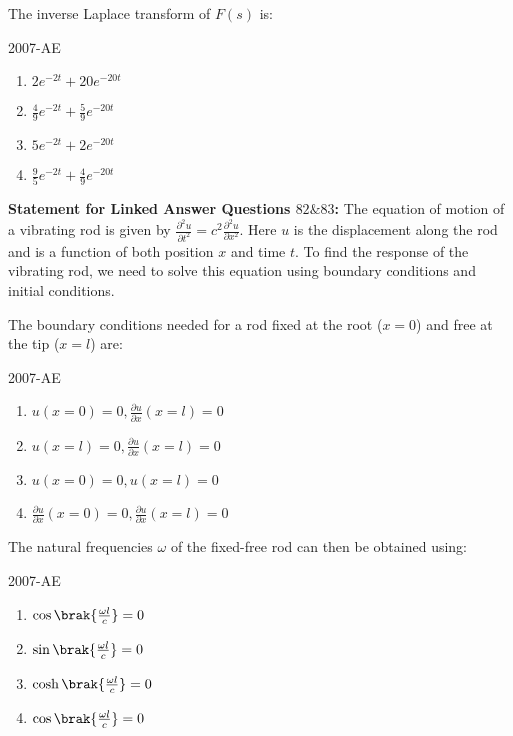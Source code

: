 \item The inverse Laplace transform of $F(s)$ is:

\hfill{2007-AE}

\begin{enumerate}
    \item  $2e^{-2t} + 20e^{-20t}$
    \item  $\frac{4}{9}e^{-2t} + \frac{5}{9}e^{-20t}$
    \item  $5e^{-2t} + 2e^{-20t}$
    \item  $\frac{9}{5}e^{-2t} + \frac{4}{9}e^{-20t}$\\
\end{enumerate}

\textbf{Statement for Linked Answer Questions $82 \& 83$:}
The equation of motion of a vibrating rod is given by $\frac{\partial^2 u}{\partial t^2} = c^2 \frac{\partial^2 u}{\partial x^2}$. Here $u$ is the displacement along the rod and is a function of both position $x$ and time $t$. To find the response of the vibrating rod, we need to solve this equation using boundary conditions and initial conditions.\\

\item The boundary conditions needed for a rod fixed at the root ($x = 0$) and free at the tip ($x = l$) are:

\hfill{2007-AE}

\begin{enumerate}
    \item  $u(x=0) = 0, \frac{\partial u}{\partial x}(x = l) = 0$
    \item  $u(x=l) = 0, \frac{\partial u}{\partial x}(x = l) = 0$
    \item  $u(x=0) = 0, u(x=l) = 0$
    \item  $\frac{\partial u}{\partial x}(x=0) = 0, \frac{\partial u}{\partial x}(x=l) = 0$\\
\end{enumerate}

\item The natural frequencies $\omega$ of the fixed-free rod can then be obtained using:

\hfill{2007-AE}

\begin{enumerate}
    \item  $\cos \brak{\frac{\omega l}{c}} = 0$
    \item  $\sin \brak{ \frac{\omega l}{c}} = 0$
    \item  $\cosh \brak{ \frac{\omega l}{c}} = 0$
    \item  $\cos \brak{\frac{\omega l}{c}} = 0$\\
\end{enumerate}


